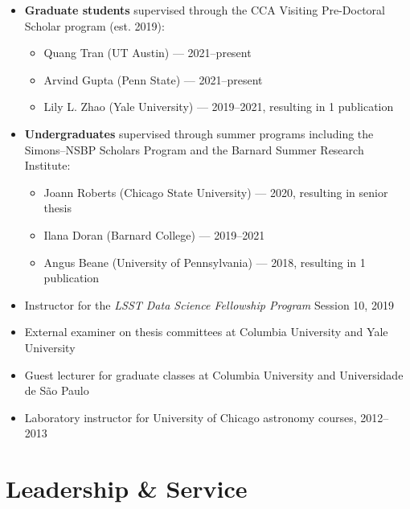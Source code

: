 \documentclass{clean_cv}
\begin{document}
\begin{itemize}
    \item \textbf{Graduate students} supervised through the CCA Visiting Pre-Doctoral Scholar program (est. 2019):
    \begin{itemize}
        \item Quang Tran (UT Austin) --- 2021--present
        \item Arvind Gupta (Penn State) --- 2021--present
        \item Lily L. Zhao (Yale University) --- 2019--2021, resulting in 1 publication
    \end{itemize}
    \item \textbf{Undergraduates} supervised through summer programs including the Simons--NSBP Scholars Program and the Barnard Summer Research Institute:
    \begin{itemize}
        \item Joann Roberts (Chicago State University) --- 2020, resulting in senior thesis
        \item Ilana Doran (Barnard College) --- 2019--2021
        \item Angus Beane (University of Pennsylvania) --- 2018, resulting in 1 publication
    \end{itemize}
    \item Instructor for the \textit{LSST Data Science Fellowship Program} Session 10, 2019
    \item External examiner on thesis committees at Columbia University and Yale University
    \item Guest lecturer for graduate classes at Columbia University and Universidade de S\~{a}o Paulo
    \item Laboratory instructor for University of Chicago astronomy courses, 2012--2013
\end{itemize}

\newpage
\section{Leadership \& Service}
\end{document}
